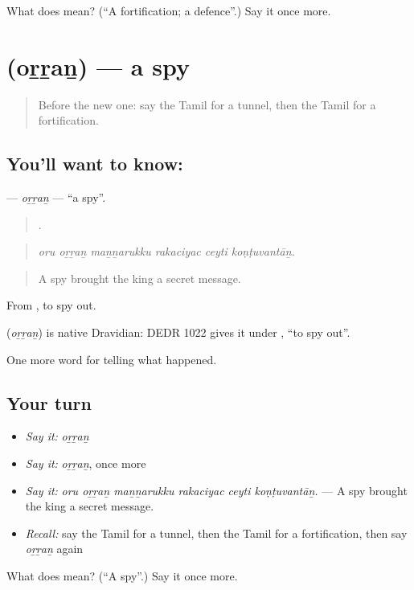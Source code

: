 \begin{tcolorbox}[breakable,colback=teal!4,colframe=teal!35!black,title={Before you move on}]
What does  mean? (\textquotedblleft{}A fortification; a defence\textquotedblright{}.) Say it once more.
\end{tcolorbox}
\section[\texorpdfstring{\ta{ஒற்றன்} (oṟṟaṉ)}{ஒற்றன் (oṟṟaṉ)}]{ (oṟṟaṉ) — a spy}

\label{lesson:TA-C335-orran}



\begin{quote}
Before the new one: say the Tamil for a tunnel, then the Tamil for a fortification.
\end{quote}

\subsection*{You'll want to know: }
\textbf{} — \emph{oṟṟaṉ} — \textquotedblleft{}a spy\textquotedblright{}.

\begin{quote}
     .
\end{quote}

\begin{quote}
\emph{oru oṟṟaṉ maṉṉarukku rakaciyac ceyti koṇṭuvantāṉ.}
\end{quote}

\begin{quote}
A spy brought the king a secret message.
\end{quote}

From , to spy out.

\begin{cousinweb}
\textbf{} (\emph{oṟṟaṉ}) is native Dravidian: DEDR 1022 gives it under , \textquotedblleft{}to spy out\textquotedblright{}.
\end{cousinweb}

\begin{grammarlens}[title={What you've built}]
One more word for telling what happened.
\end{grammarlens}

\subsection*{Your turn}
\begin{itemize}
\raggedright
  \item \emph{Say it:} \emph{oṟṟaṉ}
  \item \emph{Say it:} \emph{oṟṟaṉ}, once more
  \item \emph{Say it:} \emph{oru oṟṟaṉ maṉṉarukku rakaciyac ceyti koṇṭuvantāṉ.} — A spy brought the king a secret message.
  \item \emph{Recall:} say the Tamil for a tunnel, then the Tamil for a fortification, then say \emph{oṟṟaṉ} again
\end{itemize}

\begin{tcolorbox}[breakable,colback=teal!4,colframe=teal!35!black,title={Before you move on}]
What does  mean? (\textquotedblleft{}A spy\textquotedblright{}.) Say it once more.
\end{tcolorbox}
